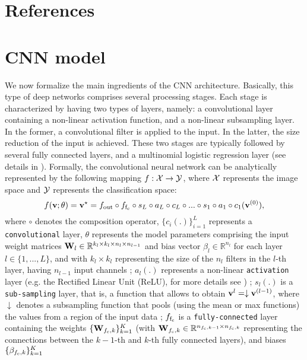 \documentclass[5p,time]{elsarticle}
\begin{document}
\section*{References}




\appendix

\section{CNN model}
\label{sec:CNN-model}

We now formalize the main ingredients of the CNN architecture.
Basically, this type of deep networks comprises several processing
stages. Each stage is characterized by having two types of layers,
namely: a convolutional layer containing a non-linear activation
function, and a non-linear subsampling layer. In the former, a
convolutional filter is applied to the input. In the latter, the
size reduction of the input is achieved. These two stages are
typically followed by several fully connected layers, and a
multinomial logistic regression layer (see details in
\cite{KrizhevskyNIPS2012}). Formally, the convolutional neural
network can be analytically represented by the following mapping
$f:{\cal X}\rightarrow {\cal Y}$, where ${\cal X}$ represents the
image space and ${\cal Y}$ represents the classification space:
\begin{equation}
f({\bf v}; \theta) = {\bf v}^{\star}=
f_{\rm out}\circ f_{\rm f_{c}} \circ s_{L} \circ a_L \circ c_L \circ ... \circ s_1 \circ a_1 \circ c_1({\bf v}^{(0)}),\label{eq:CNN1}
\end{equation}
where $\circ$ denotes the composition operator, $\{c_i(.)\}_{i=1}^L$ represents a \texttt{convolutional} layer, $\theta$ represents the model parameters
comprising the input weight matrices ${\bf W}_l\in\mathbb{R}^{k_l\times k_l\times n_l\times n_{l-1}}$ and bias vector $\beta_l\in\mathbb{R}^{n_l}$  for each layer
$l\in\{1,...,L\}$, and with $k_l\times k_l$ representing the size of the $n_l$ filters in the $l$-th layer, having $n_{l-1}$ input channels ;
$a_{l}(.)$ represents a non-linear \texttt{activation} layer (e.g. the Rectified Linear Unit (ReLU), for more details see \cite{KrizhevskyNIPS2012}) ; $s_{l}(.)$ is a \texttt{sub-sampling} layer, that is, a function that allows to obtain ${\bf v}^{l}= \downarrow {\bf v}^{(l-1)}$, where $\downarrow$ denotes a subsampling function that pools (using the mean or max functions) the values from a region of the input data ; $f_{\rm f_{c}}$ is a \texttt{fully-connected} layer containing the weights $\{{\bf W}_{f_{\rm c},k}\}_{k=1}^K$ (with  ${\bf W}_{f_{\rm c},k}\in\mathbb{R}^{n_{{f_{\rm c}},k-1}\times n_{{f_{\rm c}},k}}$ representing the connections between the $k-1$-th and $k$-th fully connected layers), and biases  $\{{\beta}_{f_{\rm c},k}\}_{k=1}^K$
\end{document}
